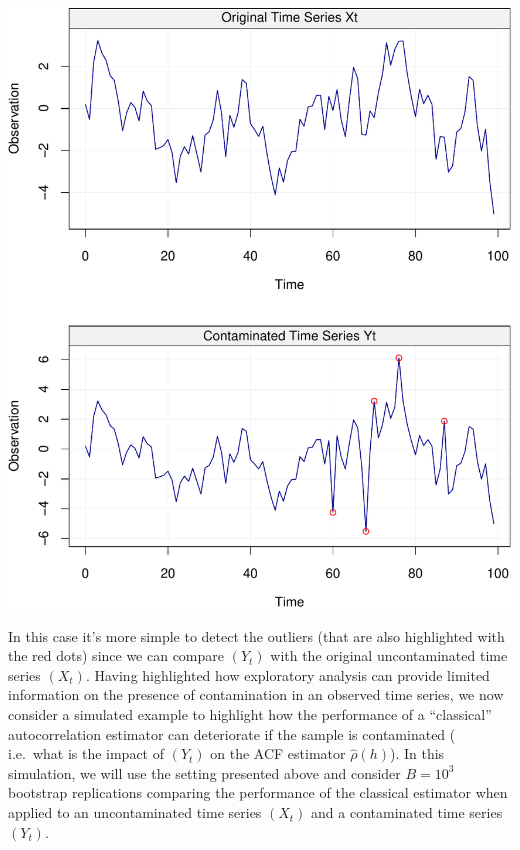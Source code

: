 \documentclass[]{book}
\theoremstyle{definition}
\theoremstyle{definition}
\theoremstyle{definition}
\theoremstyle{remark}
\begin{document}
\includegraphics{ts_files/figure-latex/XtYt-1.pdf}

In this case it's more simple to detect the outliers (that are also
highlighted with the red dots) since we can compare \((Y_t)\) with the
original uncontaminated time series \((X_t)\). Having highlighted how
exploratory analysis can provide limited information on the presence of
contamination in an observed time series, we now consider a simulated
example to highlight how the performance of a ``classical''
autocorrelation estimator can deteriorate if the sample is contaminated
( i.e.~what is the impact of \((Y_t)\) on the ACF estimator
\(\hat{\rho}(h)\)). In this simulation, we will use the setting
presented above and consider \(B = 10^3\) bootstrap replications
comparing the performance of the classical estimator when applied to an
uncontaminated time series \((X_t)\) and a contaminated time series
\((Y_t)\).
\end{document}
